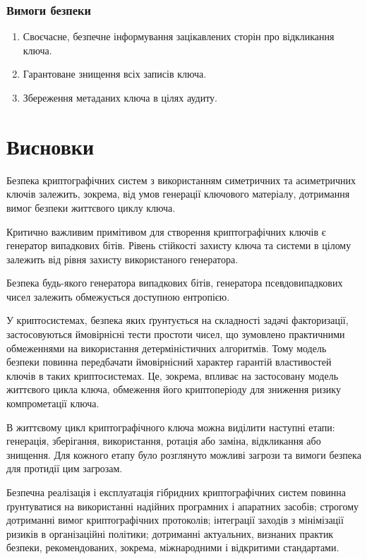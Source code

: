 \documentclass{kpi-lab}
\begin{document}
\subsection{Вимоги безпеки}
\begin{enumerate}
  \item
    Своєчасне, безпечне інформування зацікавлених
    сторін про відкликання ключа.
  \item
    Гарантоване знищення всіх записів ключа.
  \item
    Збереження метаданих ключа в цілях аудиту.
\end{enumerate}

\chapter{Висновки}

Безпека криптографічних систем з використанням симетричних
та асиметричних ключів залежить, зокрема, від умов генерації ключового
матеріалу, дотримання вимог безпеки життєвого циклу ключа.

Критично важливим примітивом для створення криптографічних
ключів є генератор випадкових бітів. Рівень стійкості
захисту ключа та системи в цілому залежить від рівня
захисту використаного генератора.

Безпека будь-якого генератора випадкових бітів, генератора
псевдовипадкових чисел залежить обмежується доступною ентропією.

У криптосистемах, безпека яких ґрунтується на складності
задачі факторизації, застосовуються ймовірнісні тести простоти чисел,
що зумовлено практичними обмеженнями на використання детерміністичних
алгоритмів. Тому модель безпеки повинна передбачати
ймовірнісний характер гарантій властивостей ключів в таких
криптосистемах. Це, зокрема, впливає на застосовану модель
життєвого цикла ключа, обмеження його криптоперіоду для
зниження ризику компрометації ключа.

В життєвому цикл криптографічного ключа можна виділити
наступні етапи: генерація, зберігання, використання,
ротація або заміна, відкликання або знищення.
Для кожного етапу було розглянуто можливі загрози та вимоги
безпека для протидії цим загрозам.

Безпечна реалізація і експлуатація гібридних
криптографічних систем повинна ґрунтуватися на
використанні надійних програмних і апаратних засобів;
строгому дотриманні вимог криптографічних протоколів;
інтеграції заходів з мінімізації ризиків в організаційні політики;
дотриманні актуальних, визнаних практик безпеки,
рекомендованих, зокрема, міжнародними і відкритими стандартами.

\printbibliography[
  heading=bibintoc,
  title={Перелік використаних джерел}
]
\end{document}
